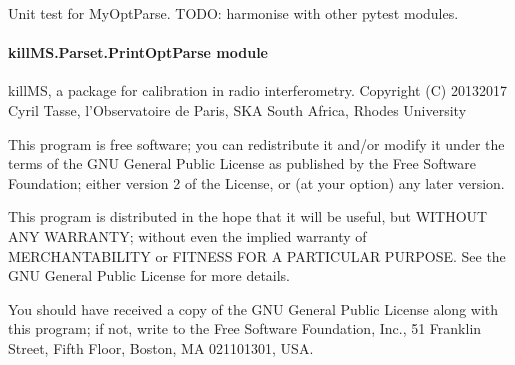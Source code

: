 \documentclass[letterpaper,10pt,english]{sphinxmanual}
\begin{document}

\begin{fulllineitems}
\label{\detokenize{api/killMS.Parset:killMS.Parset.MyOptParse.test}}
\pysigstartsignatures
{}
\pysigstopsignatures
\sphinxAtStartPar
Unit test for MyOptParse.
TODO: harmonise with other pytest modules.

\end{fulllineitems}



\paragraph{killMS.Parset.PrintOptParse module}
\label{\detokenize{api/killMS.Parset:module-killMS.Parset.PrintOptParse}}\label{\detokenize{api/killMS.Parset:killms-parset-printoptparse-module}}
\sphinxAtStartPar
killMS, a package for calibration in radio interferometry.
Copyright (C) 2013\sphinxhyphen{}2017  Cyril Tasse, l’Observatoire de Paris,
SKA South Africa, Rhodes University

\sphinxAtStartPar
This program is free software; you can redistribute it and/or
modify it under the terms of the GNU General Public License
as published by the Free Software Foundation; either version 2
of the License, or (at your option) any later version.

\sphinxAtStartPar
This program is distributed in the hope that it will be useful,
but WITHOUT ANY WARRANTY; without even the implied warranty of
MERCHANTABILITY or FITNESS FOR A PARTICULAR PURPOSE.  See the
GNU General Public License for more details.

\sphinxAtStartPar
You should have received a copy of the GNU General Public License
along with this program; if not, write to the Free Software
Foundation, Inc., 51 Franklin Street, Fifth Floor, Boston, MA  02110\sphinxhyphen{}1301, USA.
\end{document}
